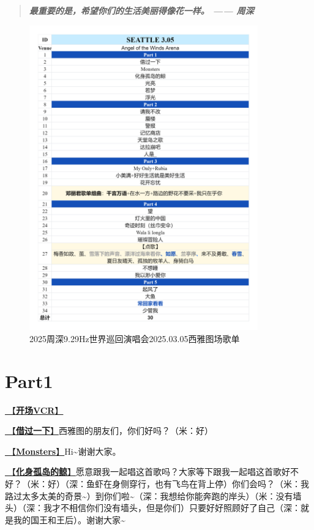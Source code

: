 \documentclass[]{ctexbook}
\begin{document}
\begin{quote}
\textbf{\emph{最重要的是，希望你们的生活美丽得像花一样。 ------ 周深}}
\end{quote}

\begin{figure}

{\centering \includegraphics[width=280pt]{img/playlists/playlists-seattle-20250305} 

}

\caption{2025周深9.29Hz世界巡回演唱会2025.03.05西雅图场歌单}\label{fig:unnamed-chunk-179}
\end{figure}

\newpage

\section{Part1}\label{Seattle-20250305-part1}

\hyperref[opening-vcr]{🎥【\textbf{开场VCR}】}

\hyperref[I-will-go-my-way]{🎵【\textbf{借过一下}】}西雅图的朋友们，你们好吗？（米：好）

\hyperref[Monsters]{🎵【\textbf{Monsters}】}Hi\textasciitilde 谢谢大家。

\hyperref[hua-shen-gu-dao-de-jing]{🎵【\textbf{化身孤岛的鲸}】}愿意跟我一起唱这首歌吗？大家等下跟我一起唱这首歌好不好？（米：好）（深：鱼虾在身侧穿行，也有飞鸟在背上停）你们会吗？（米：我路过太多太美的奇景\textasciitilde）到你们啦\textasciitilde（深：我想给你能奔跑的岸头）（米：没有墙头）（深：我才不相信你们没有墙头，但是你们）只要好好照顾好了自己（深：就是我的国王和王后）。谢谢大家\textasciitilde{}
\end{document}
